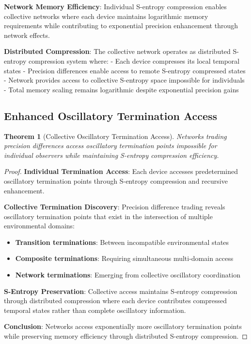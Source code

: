 \documentclass[12pt,a4paper]{article}
\newtheorem{theorem}{Theorem}[section]
\begin{document}
\textbf{Network Memory Efficiency}: Individual S-entropy compression enables collective networks where each device maintains logarithmic memory requirements while contributing to exponential precision enhancement through network effects.

\textbf{Distributed Compression}: The collective network operates as distributed S-entropy compression system where:
- Each device compresses its local temporal states
- Precision differences enable access to remote S-entropy compressed states
- Network provides access to collective S-entropy space impossible for individuals
- Total memory scaling remains logarithmic despite exponential precision gains

\subsection{Enhanced Oscillatory Termination Access}

\begin{theorem}[Collective Oscillatory Termination Access]
Networks trading precision differences access oscillatory termination points impossible for individual observers while maintaining S-entropy compression efficiency.
\end{theorem}

\begin{proof}
\textbf{Individual Termination Access}: Each device accesses predetermined oscillatory termination points through S-entropy compression and recursive enhancement.

\textbf{Collective Termination Discovery}: Precision difference trading reveals oscillatory termination points that exist in the intersection of multiple environmental domains:
\begin{itemize}
\item \textbf{Transition terminations}: Between incompatible environmental states
\item \textbf{Composite terminations}: Requiring simultaneous multi-domain access
\item \textbf{Network terminations}: Emerging from collective oscillatory coordination
\end{itemize}

\textbf{S-Entropy Preservation}: Collective access maintains S-entropy compression through distributed compression where each device contributes compressed temporal states rather than complete oscillatory information.

\textbf{Conclusion}: Networks access exponentially more oscillatory termination points while preserving memory efficiency through distributed S-entropy compression.
\end{proof}
\end{document}
